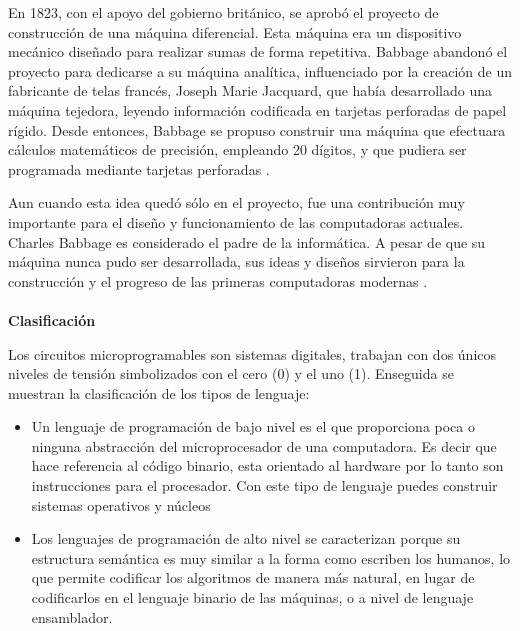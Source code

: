 \documentclass[11pt, letterpaper, spanish]{article}
\begin{document}
{	
	
\par{En 1823, con el apoyo del gobierno  británico, se aprobó el proyecto de construcción de una máquina diferencial. Esta máquina era un dispositivo mecánico diseñado para realizar sumas de forma repetitiva. Babbage abandonó el proyecto para dedicarse a su máquina analítica, influenciado por la creación de un fabricante de telas francés, Joseph Marie Jacquard, que había desarrollado una máquina tejedora, leyendo información codificada en tarjetas perforadas de papel rígido. Desde entonces, Babbage se propuso construir una máquina que efectuara cálculos matemáticos de precisión, empleando 20 dígitos, y que pudiera ser programada mediante tarjetas perforadas \cite{garfinkel_shevtsov_guo_2017}.}

\par{Aun cuando esta idea quedó sólo en el proyecto, fue una contribución muy importante para el diseño y funcionamiento de las computadoras actuales. Charles Babbage es considerado el padre de la informática. A pesar de que su máquina nunca pudo ser desarrollada, sus ideas y diseños sirvieron para la construcción y el progreso de las primeras computadoras modernas \cite{garfinkel_shevtsov_guo_2017}.}
\\ \\ 
   \textbf{Clasificación}
   \par{Los circuitos microprogramables son sistemas digitales, trabajan con dos únicos niveles de tensión simbolizados con el cero (0) y el uno (1). Enseguida se muestran la clasificación de los tipos de lenguaje: }
   
   \begin{itemize}
       \item{Un lenguaje de programación de bajo nivel es el que proporciona poca o ninguna abstracción del microprocesador de una computadora. Es decir que hace referencia al código binario, esta orientado al hardware por lo tanto son instrucciones para el procesador. Con este tipo de lenguaje puedes construir sistemas operativos y núcleos}
       \item{Los lenguajes de programación de alto nivel se caracterizan porque su estructura semántica es muy similar a la forma como escriben los humanos, lo que permite codificar los algoritmos de manera más natural, en lugar de codificarlos en el lenguaje binario de las máquinas, o a nivel de lenguaje ensamblador.}
   \end{itemize} 
  
}
\end{document}
